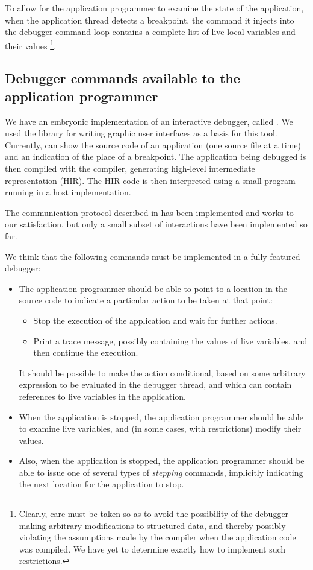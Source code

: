 To allow for the application programmer to examine the state of the
application, when the application thread detects a breakpoint, the
command it injects into the debugger command loop contains a complete
list of live local variables and their values%
\footnote{Clearly, care must be taken so as to avoid the possibility
  of the debugger making arbitrary modifications to structured data,
  and thereby possibly violating the assumptions made by the compiler
  when the application code was compiled.  We have yet to determine
  exactly how to implement such restrictions.}.

\subsection{Debugger commands available to the application programmer}

We have an embryonic implementation of an interactive debugger, called
\clordane{}.  We used the \mcclim{} library for writing graphic user
interfaces as a basis for this tool.  Currently, \clordane{} can show
the source code of an application (one source file at a time) and an
indication of the place of a breakpoint.  The application being
debugged is then compiled with the \sicl{} compiler, generating
high-level intermediate representation (HIR).  The HIR code is then
interpreted using a small program running in a host \commonlisp{}
implementation.

The communication protocol described in
 has been implemented
and works to our satisfaction, but only a small subset of interactions
have been implemented so far.

We think that the following commands must be implemented in a fully
featured debugger:

\begin{itemize}
\item The application programmer should be able to point to a location
  in the source code to indicate a particular action to be taken at
  that point:
  \begin{itemize}
  \item Stop the execution of the application and wait for further
    actions.
  \item Print a trace message, possibly containing the values of live
    variables, and then continue the execution. 
  \end{itemize}
  It should be possible to make the action conditional, based on some
  arbitrary expression to be evaluated in the debugger thread, and
  which can contain references to live variables in the application.
\item When the application is stopped, the application programmer
  should be able to examine live variables, and (in some cases, with
  restrictions) modify their values.
\item Also, when the application is stopped, the application
  programmer should be able to issue one of several types of
  \emph{stepping} commands, implicitly indicating the next location
  for the application to stop.
\end{itemize}
